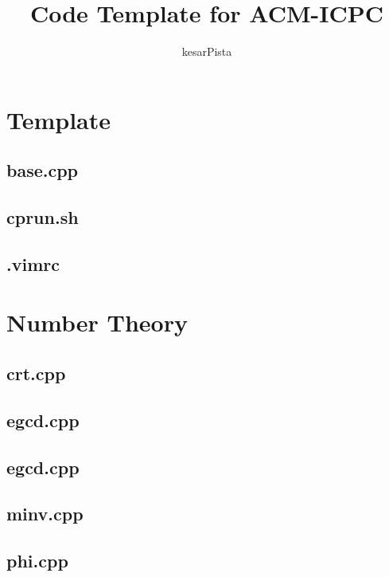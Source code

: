 \documentclass[a4paper, twocolumn]{article}
\title{Code Template for ACM-ICPC}
\author{kesarPista}
\begin{document}
\begin{titlepage}
\maketitle
\thispagestyle{empty}
\pagebreak
\pagestyle{fancy}
\lhead{}
\rhead{}
\cfoot{}
\tableofcontents
\end{titlepage}

\pagestyle{fancy}
\cfoot{- \thepage \ -}
  
\section{Template}
\subsection{base.cpp}

\subsection{cprun.sh}

\subsection{.vimrc}



\section{Number Theory}
\subsection{crt.cpp}

\subsection{egcd.cpp}

\subsection{egcd.cpp}

\subsection{minv.cpp}

\subsection{phi.cpp}

\end{document}
